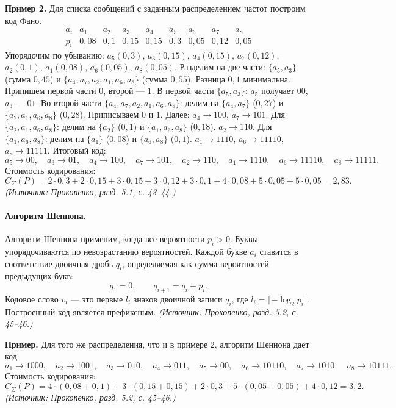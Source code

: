 \documentclass[a4paper,12pt]{article}
\begin{document}
\textbf{Пример 2.} Для списка сообщений с заданным распределением частот построим код Фано.
\[
\begin{array}{c|cccccccc}
a_i & a_1 & a_2 & a_3 & a_4 & a_5 & a_6 & a_7 & a_8\\
\hline
p_i & 0{,}08 & 0{,}1 & 0{,}15 & 0{,}15 & 0{,}3 & 0{,}05 & 0{,}12 & 0{,}05
\end{array}
\]
Упорядочим по убыванию: \(a_5(0{,}3)\), \(a_3(0{,}15)\), \(a_4(0{,}15)\), \(a_7(0{,}12)\), \(a_2(0{,}1)\), \(a_1(0{,}08)\), \(a_6(0{,}05)\), \(a_8(0{,}05)\).
Разделим на две части: \(\{a_5,a_3\}\) (сумма \(0{,}45\)) и \(\{a_4,a_7,a_2,a_1,a_6,a_8\}\) (сумма \(0{,}55\)). Разница \(0{,}1\) минимальна. Припишем первой части \(0\), второй — \(1\).
В первой части \(\{a_5,a_3\}\): \(a_5\) получает \(00\), \(a_3\) — \(01\).
Во второй части \(\{a_4,a_7,a_2,a_1,a_6,a_8\}\): делим на \(\{a_4,a_7\}\) (\(0{,}27\)) и \(\{a_2,a_1,a_6,a_8\}\) (\(0{,}28\)). Приписываем \(0\) и \(1\).
Далее: \(a_4\to 100\), \(a_7\to 101\). Для \(\{a_2,a_1,a_6,a_8\}\): делим на \(\{a_2\}\) (\(0{,}1\)) и \(\{a_1,a_6,a_8\}\) (\(0{,}18\)). \(a_2\to 110\). Для \(\{a_1,a_6,a_8\}\): делим на \(\{a_1\}\) (\(0{,}08\)) и \(\{a_6,a_8\}\) (\(0{,}1\)). \(a_1\to 1110\), \(a_6\to 11110\), \(a_8\to 11111\).
Итоговый код:
\[
a_5\to 00,\quad a_3\to 01,\quad a_4\to 100,\quad a_7\to 101,\quad a_2\to 110,\quad a_1\to 1110,\quad a_6\to 11110,\quad a_8\to 11111.
\]
Стоимость кодирования:
\[
C_\Sigma(P)=2\cdot0{,}3+2\cdot0{,}15+3\cdot0{,}15+3\cdot0{,}12+3\cdot0{,}1+4\cdot0{,}08+5\cdot0{,}05+5\cdot0{,}05=2{,}83.
\]
\textit{(Источник: Прокопенко, разд. 5.1, с. 43--44.)}

\paragraph{Алгоритм Шеннона.}
Алгоритм Шеннона применим, когда все вероятности \(p_i>0\). Буквы упорядочиваются по невозрастанию вероятностей. Каждой букве \(a_i\) ставится в соответствие двоичная дробь \(q_i\), определяемая как сумма вероятностей предыдущих букв:
\[
q_1=0,\qquad q_{i+1}=q_i+p_i.
\]
Кодовое слово \(v_i\) — это первые \(l_i\) знаков двоичной записи \(q_i\), где \(l_i=\lceil -\log_2 p_i\rceil\). Построенный код является префиксным.
\textit{(Источник: Прокопенко, разд. 5.2, с. 45--46.)}

\textbf{Пример.} Для того же распределения, что и в примере 2, алгоритм Шеннона даёт код:
\[
a_1\to 1000,\quad a_2\to 1001,\quad a_3\to 010,\quad a_4\to 011,\quad a_5\to 00,\quad a_6\to 10110,\quad a_7\to 1010,\quad a_8\to 10111.
\]
Стоимость кодирования:
\[
C_\Sigma(P)=4\cdot(0{,}08+0{,}1)+3\cdot(0{,}15+0{,}15)+2\cdot0{,}3+5\cdot(0{,}05+0{,}05)+4\cdot0{,}12=3{,}2.
\]
\textit{(Источник: Прокопенко, разд. 5.2, с. 45--46.)}
\end{document}
